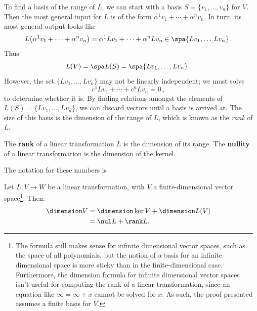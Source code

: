 To find a basis of the range of $L$, we can start with a basis $S=\{v_1, \ldots, v_n\} $ for $V$. Then
the most general input for $L$ is of the form  $\alpha^1 v_1 + \cdots + \alpha^n v_n$. In turn, its most general output looks like
\[
L\big(\alpha^1 v_1 + \cdots + \alpha^n v_n\big)=\alpha^1 Lv_1 + \cdots + \alpha^n Lv_n\in \spa\{Lv_1,\ldots\,Lv_n\}\, .
\]
Thus
\[
L(V)=\spa L(S) = \spa \{Lv_1, \ldots, Lv_n\}\, .
\]
However, the set $\{Lv_1, \ldots, Lv_n\}$ may not be linearly independent; we must solve 
\[
c^1Lv_1+ \cdots + c^nLv_n=0\, ,
\]
to determine whether it is.
By finding relations amongst the elements of $L(S)=\{Lv_1,\ldots ,L v_n\}$, we can discard vectors until a basis is arrived at.  The size of this basis is the dimension of the range of $L$, which is known as the \emph{rank} of $L$.


\begin{definition}
The {\bfseries rank} of a linear transformation $L$ is the dimension of its range.
The {\bfseries nullity} of a linear transformation is the dimension of the kernel.
\end{definition}
The notation for these numbers is 

\begin{theorem}\label{dimension_formula}
Let $L \colon V\rightarrow W$ be a linear transformation, with $V$ a finite-dimensional vector space\footnote{The formula still makes sense for infinite dimensional vector spaces, such as the space of all polynomials, but the notion of a basis for an infinite dimensional space is more sticky than in the finite-dimensional case.  Furthermore, the dimension formula for infinite dimensional vector spaces isn't useful for computing the rank of a linear transformation, since an equation like $\infty=\infty+x$ cannot be solved for $x$. As such, the proof presented assumes a finite basis for $V$.}.  Then:
\begin{align*}
\dimension V &= \dimension \ker V + \dimension L(V)\\
 &= \nul L + \rank L.
\end{align*}
\end{theorem}



